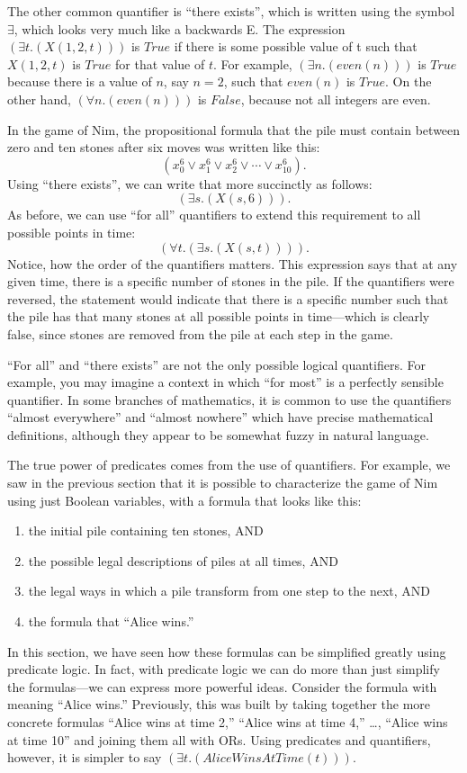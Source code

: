 The other common quantifier is ``there exists'', which is written using the symbol $\exists$, 
which looks very much like a backwards E. The expression $(\exists t.(X(1, 2, t)))$ 
is $True$ if there is some possible value of t such that $X(1, 2, t)$ is $True$ 
for that value of $t$. For example, $(\exists n.(even(n)))$ is $True$ because there 
is a value of $n$, say $n=2$, such that $even(n)$ is $True$. On the other hand, 
$(\forall n.(even(n)))$ is $False$, because not all integers are even.

In the game of Nim, the propositional formula that the pile must contain between zero and
ten stones after six moves was written like this:
$$(x_{0}^{6} \vee x_{1}^{6} \vee x_{2}^{6} \vee \cdots \vee x_{10}^{6}).$$
Using ``there exists'', we can write that more succinctly as follows:
$$(\exists s.(X(s, 6))).$$
As before, we can use ``for all'' quantifiers to extend this requirement to all possible
points in time:
$$(\forall t.(\exists s.(X(s, t)))).$$
Notice, how the order of the quantifiers matters. This expression says that at any given
time, there is a specific number of stones in the pile. If the quantifiers were reversed,
the statement would indicate that there is a specific number such that the pile has that
many stones at all possible points in time---which is clearly false, since stones are
removed from the pile at each step in the game.

\begin{aside}
``For all'' and ``there exists'' are not the only possible logical quantifiers. For example, you may imagine a context
in which ``for most'' is a perfectly sensible quantifier. In some branches of mathematics, it is common to use the
quantifiers ``almost everywhere'' and ``almost nowhere'' which have precise mathematical definitions, although they
appear to be somewhat fuzzy in natural language.
\end{aside}

The true power of predicates comes from the use of quantifiers. For example, we saw in the 
previous section that it
is possible to characterize the game of Nim using just Boolean variables, with a formula that looks like this:
\begin{enumerate}
\item the initial pile containing ten stones, AND
\item the possible legal descriptions of piles at all times, AND
\item the legal ways in which a pile transform from one step to the next, AND
\item the formula that ``Alice wins.''
\end{enumerate}
In this section, we have seen how these formulas can be simplified greatly using predicate logic. In fact, with predicate
logic we can do more than just simplify the formulas---we can express more powerful ideas. Consider the formula with
meaning ``Alice wins.'' Previously, this was built by taking together the more concrete formulas ``Alice wins at
time 2,'' ``Alice wins at time 4,'' \dots, ``Alice wins at time 10'' and joining them all with ORs. Using predicates
and quantifiers, however, it is simpler to say $(\exists t.(AliceWinsAtTime(t)))$.

